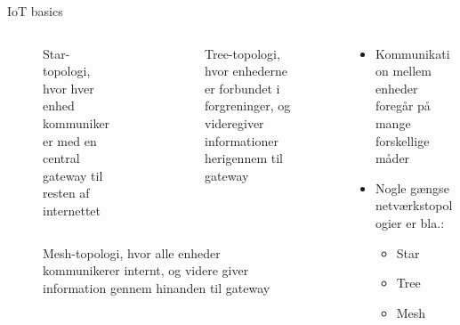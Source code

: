 \documentclass[aspectratio=169]{beamer}
\begin{document}
\begin{frame}{IoT basics}
\begin{columns}
	\begin{column}{0.5\textwidth}
		\centering
		\captionsetup{format=tcbcaptionsmall}
		\begin{columns}
			\begin{column}{0.5\textwidth}
				\begin{figure}[height=0.2\textheight]
  					
  					\caption{Star-topologi, hvor hver enhed kommunikerer med en central gateway til resten af internettet}
  					\label{fig:iot-star}
				\end{figure}
			\end{column}
			\begin{column}{0.5\textwidth}
				\begin{figure}[height=0.2\textheight]
  					
  					\caption{Tree-topologi, hvor enhederne er forbundet i forgreninger, og videregiver informationer herigennem til gateway}
  					\label{fig:iot-tree}
				\end{figure}
			\end{column}
		\end{columns}
		\begin{columns}
			\begin{column}{0.5\textwidth}
				\begin{figure}[height=0.2\textheight]
  					
  					\caption{Mesh-topologi, hvor alle enheder kommunikerer internt, og videre giver information gennem hinanden til gateway}
  					\label{fig:iot-mesh}
				\end{figure}
			\end{column}
		\end{columns}
	\end{column}
	\begin{column}{0.5\textwidth}
		\begin{textBox}
			\begin{itemize}
				\item Kommunikation mellem enheder foregår på mange forskellige måder
				\item Nogle gængse netværkstopologier er bla.:
				\begin{itemize}
					\item Star
					\item Tree
					\item Mesh
				\end{itemize}
			\end{itemize}
		\end{textBox}
	\end{column}
\end{columns}
\end{frame}
\end{document}
